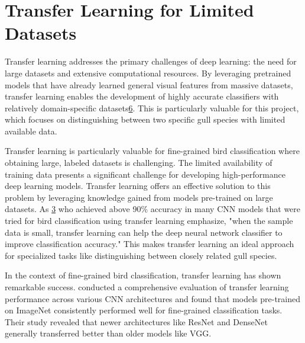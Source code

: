 \documentclass[a4paper,12pt]{report}
\begin{document}

\section*{Transfer Learning for Limited Datasets}
Transfer learning addresses the primary challenges of deep learning: the need for large datasets and extensive computational resources. By leveraging pretrained models that have already learned general visual features from massive datasets, transfer learning enables the development of highly accurate classifiers with relatively domain-specific datasets\href{https://arxiv.org/abs/2201.09679}{6}. This is particularly valuable for this project, which focuses on distinguishing between two specific gull species with limited available data.

Transfer learning is particularly valuable for fine-grained bird classification where obtaining large, labeled datasets is challenging. The limited availability of training data presents a significant challenge for developing high-performance deep learning models. Transfer learning offers an effective solution to this problem by leveraging knowledge gained from models pre-trained on large datasets. As \citep{tan2018survey} \href{https://ijece.iaescore.com/index.php/IJECE/article/view/24833}{3} who achieved above 90\% accuracy in many CNN models that were tried for bird classification using transfer learning emphasize, "when the sample data is small, transfer learning can help the deep neural network classifier to improve classification accuracy." This makes transfer learning an ideal approach for specialized tasks like distinguishing between closely related gull species.

In the context of fine-grained bird classification, transfer learning has shown remarkable success. \citep{kornblith2019better} conducted a comprehensive evaluation of transfer learning performance across various CNN architectures and found that models pre-trained on ImageNet consistently performed well for fine-grained classification tasks. Their study revealed that newer architectures like ResNet and DenseNet generally transferred better than older models like VGG.
\end{document}
